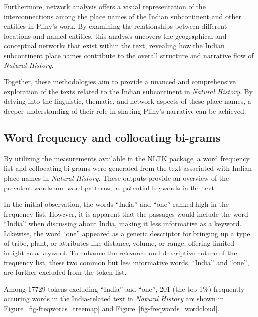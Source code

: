 \documentclass[
  12pt,
]{article}
\begin{document}
Furthermore, network analysis offers a visual representation of the
interconnections among the place names of the Indian subcontinent and
other entities in Pliny's work. By examining the relationships between
different locations and named entities, this analysis uncovers the
geographical and conceptual networks that exist within the text,
revealing how the Indian subcontinent place names contribute to the
overall structure and narrative flow of \emph{Natural History}.

Together, these methodologies aim to provide a nuanced and comprehensive
exploration of the texts related to the Indian subcontinent in
\emph{Natural History}. By delving into the linguistic, thematic, and
network aspects of these place names, a deeper understanding of their
role in shaping Pliny's narrative can be achieved.

\hypertarget{word-frequency-and-collocating-bi-grams}{%
\subsection{Word frequency and collocating
bi-grams}\label{word-frequency-and-collocating-bi-grams}}

By utilizing the measurements available in the
\href{https://www.nltk.org/}{NLTK} package, a word frequency list and
collocating bi-grams were generated from the text associated with Indian
place names in \emph{Natural History}. These outputs provide an overview
of the prevalent words and word patterns, as potential keywords in the
text.

In the initial observation, the words ``India'' and ``one'' ranked high
in the frequency list. However, it is apparent that the passages would
include the word ``India'' when discussing about India, making it less
informative as a keyword. Likewise, the word ``one'' appeared as a
generic descriptor for bringing up a type of tribe, plant, or attributes
like distance, volume, or range, offering limited insight as a keyword.
To enhance the relevance and descriptive nature of the frequency list,
these two common but less informative words, ``India'' and ``one'', are
further excluded from the token list.

Among 17729 tokens excluding ``India'' and ``one'', 201 (the top 1\%)
frequently occuring words in the India-related text in \emph{Natural
History} are shown in Figure~\ref{fig-freqwords_treemap} and
Figure~\ref{fig-freqwords_wordcloud}.
\end{document}
